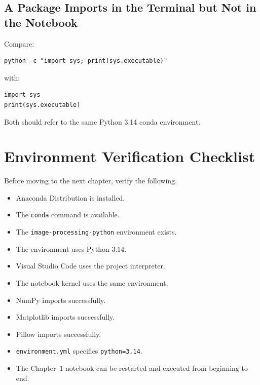 \subsection{A Package Imports in the Terminal but Not in the Notebook}

Compare:

\begin{verbatim}
python -c "import sys; print(sys.executable)"
\end{verbatim}

with:

\begin{verbatim}
import sys
print(sys.executable)
\end{verbatim}

Both should refer to the same Python 3.14 conda environment.


\section{Environment Verification Checklist}
\label{sec:environment-checklist}

Before moving to the next chapter, verify the following.

\begin{itemize}[label=$\square$]

    \item Anaconda Distribution is installed.
    \item The \texttt{conda} command is available.
    \item The \texttt{image-processing-python} environment exists.
    \item The environment uses Python 3.14.
    \item Visual Studio Code uses the project interpreter.
    \item The notebook kernel uses the same environment.
    \item NumPy imports successfully.
    \item Matplotlib imports successfully.
    \item Pillow imports successfully.
    \item \texttt{environment.yml} specifies \texttt{python=3.14}.
    \item The Chapter~1 notebook can be restarted and executed from
    beginning to end.

\end{itemize}



